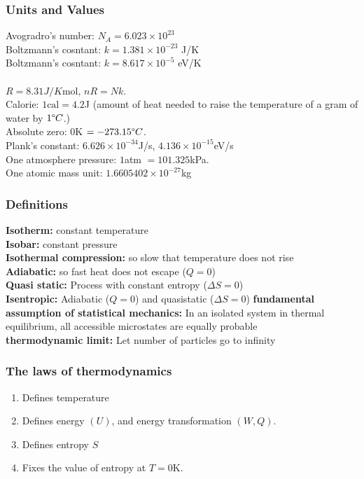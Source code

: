 \documentclass[a4paper, norsk, 8pt]{article}
\begin{document}
\tiny
\begin{multicols*}{3}
\subsubsection*{\scriptsize Units and Values}
Avogradro's number: $N_A=6.023\times 10^{23}$ \\
Boltzmann's cosntant: $k=1.381\times 10^{-23}$ J/K\\
Boltzmann's cosntant: $k = 8.617 \times 10^{-5}$ eV/K\\
\\ $R = 8.31J/K\text{mol}$, $nR=Nk$.\\
Calorie: $1\text{cal} = 4.2$J (amount of heat needed to raise the temperature of a gram of water by $1\degree C$.)\\
Absolute zero: $0$K $=-273.15\degree C$.\\
Plank's constant: $6.626\times 10^{-34}$J/s, $4.136\times 10^{-15}$eV/s\\
One atmosphere pressure: $1$atm $=101.325$kPa.\\
One atomic mass unit: $1.6605402\times 10^{-27}$kg

\subsubsection*{\scriptsize Definitions}
\textbf{Isotherm:} constant temperature \\
\textbf{Isobar:} constant pressure \\
\textbf{Isothermal compression:} so slow that temperature does not rise \\
\textbf{Adiabatic:} so fast heat does not escape ($Q=0$) \\
\textbf{Quasi static:} Process with constant entropy ($\Delta S = 0$)\\
\textbf{Isentropic:} Adiabatic ($Q=0$) and quasistatic ($\Delta S = 0$)
\textbf{fundamental assumption of statistical mechanics:} In an isolated system in thermal equilibrium, all accessible microstates are equally probable\\
\textbf{thermodynamic limit:} Let number of particles go to infinity

\subsubsection*{\scriptsize The laws of thermodynamics}
\begin{enumerate}
  \setcounter{enumi}{0}
  \item Defines temperature
  \item Defines energy $(U)$, and energy transformation $(W, Q)$.
  \item Defines entropy $S$
  \item Fixes the value of entropy at $T=0$K.
\end{enumerate}



\end{multicols*}
\end{document}
